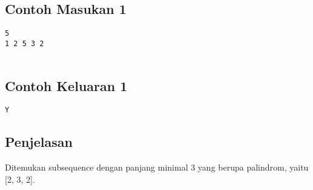 \documentclass{article}
\begin{document}
\linebreak
\begin{multicols}{2}
\subsection*{Contoh Masukan 1}
\begin{lstlisting}
5
1 2 5 3 2


\end{lstlisting}
\null
\columnbreak
\subsection*{Contoh Keluaran 1}
\begin{lstlisting}
Y
\end{lstlisting}
\vfill
\null
\end{multicols}

\subsection*{Penjelasan}
Ditemukan subsequence dengan panjang minimal 3 yang berupa palindrom, yaitu [2, 3, 2].
\end{document}
